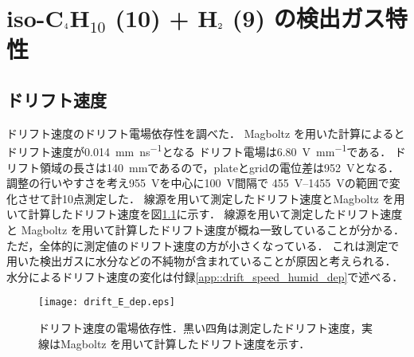 \documentclass[../master]{subfiles}
\begin{document}
\chapter{iso-C$_{\text 4}$H$_{\text{10}}$ (10) + H$_{\text 2}$ (9) の検出ガス特性}

\section{ドリフト速度}
ドリフト速度のドリフト電場依存性を調べた．
Magboltz を用いた計算によるとドリフト速度が\SI{0.014}{\milli\metre\per\nano\second}となる
ドリフト電場は\SI{6.80}{\volt\per\milli\metre}である．
ドリフト領域の長さは\SI{140}{\milli\metre}であるので，plateとgridの電位差は\SI{952}{\volt}となる．
調整の行いやすさを考え\SI{955}{\volt}を中心に\SI{100}{\volt}間隔で
\SIrange{455}{1455}{\volt}の範囲で変化させて計10点測定した．
線源を用いて測定したドリフト速度とMagboltz を用いて計算したドリフト速度を図\ref{fig::drift_speed_E_dep}に示す．
線源を用いて測定したドリフト速度と Magboltz を用いて計算したドリフト速度が概ね一致していることが分かる．
ただ，全体的に測定値のドリフト速度の方が小さくなっている．
これは測定で用いた検出ガスに水分などの不純物が含まれていることが原因と考えられる．
水分によるドリフト速度の変化は付録\ref{app::drift_speed_humid_dep}で述べる．
\begin{figure}
  \centering
  \texttt{[image: drift\_E\_dep.eps]}
  \caption{ドリフト速度の電場依存性．黒い四角は測定したドリフト速度，実線はMagboltz を用いて計算したドリフト速度を示す．}
  \label{fig::drift_speed_E_dep}
\end{figure}
\end{document}
